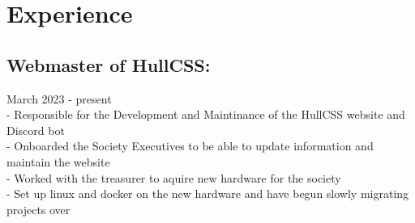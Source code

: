 \section{Experience}

\subsection{Webmaster of HullCSS:} March 2023 - present \\
\:-\: Responsible for the Development and Maintinance of the HullCSS website and Discord bot \\
\:-\: Onboarded the Society Executives to be able to update information and maintain the website \\
\:-\: Worked with the treasurer to aquire new hardware for the society \\
\:-\: Set up linux and docker on the new hardware and have begun slowly migrating projects over \\
